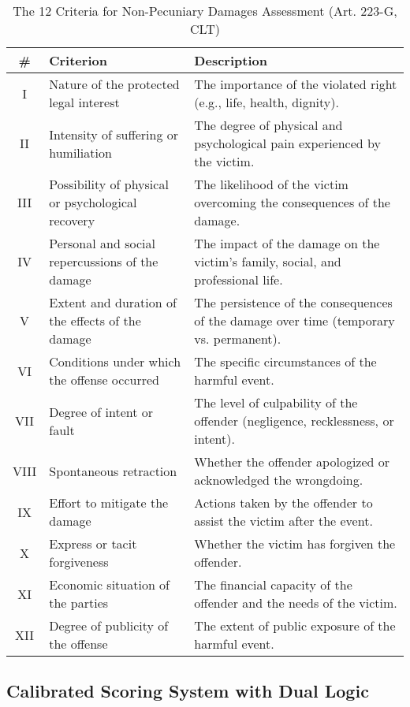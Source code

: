 \documentclass[11pt,a4paper]{article}
\begin{document}
\begin{table}[ht]
\centering
\caption{The 12 Criteria for Non-Pecuniary Damages Assessment (Art. 223-G, CLT)}
\label{tab:criteria}
\small
\begin{tabular}{@{}clp{7cm}@{}}
\toprule
\textbf{\#} & \textbf{Criterion} & \textbf{Description} \\ 
\midrule
I & Nature of the protected legal interest & The importance of the violated right (e.g., life, health, dignity). \\
II & Intensity of suffering or humiliation & The degree of physical and psychological pain experienced by the victim. \\
III & Possibility of physical or psychological recovery & The likelihood of the victim overcoming the consequences of the damage. \\
IV & Personal and social repercussions of the damage & The impact of the damage on the victim's family, social, and professional life. \\
V & Extent and duration of the effects of the damage & The persistence of the consequences of the damage over time (temporary vs. permanent). \\
VI & Conditions under which the offense occurred & The specific circumstances of the harmful event. \\
VII & Degree of intent or fault & The level of culpability of the offender (negligence, recklessness, or intent). \\
VIII & Spontaneous retraction & Whether the offender apologized or acknowledged the wrongdoing. \\
IX & Effort to mitigate the damage & Actions taken by the offender to assist the victim after the event. \\
X & Express or tacit forgiveness & Whether the victim has forgiven the offender. \\
XI & Economic situation of the parties & The financial capacity of the offender and the needs of the victim. \\
XII & Degree of publicity of the offense & The extent of public exposure of the harmful event. \\
\bottomrule
\end{tabular}
\end{table}

\subsection{Calibrated Scoring System with Dual Logic}
\end{document}
